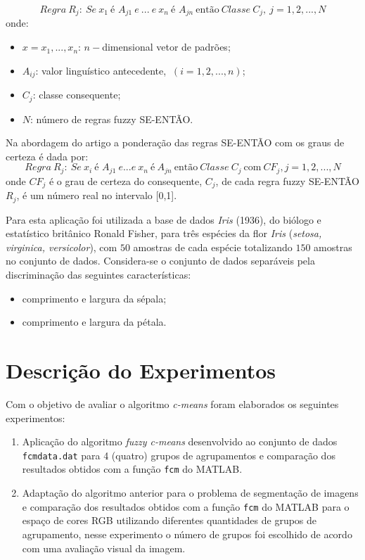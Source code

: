 \documentclass[12pt,a4paper]{article}
\numberwithin{equation}{section}
\begin{document}
{\begin{equation} \label{eq:eq1}
Regra~R_{j}:~Se~x_{1}~ \text{é }A_{j1}~e~...~e~x_{n}~\text{é }A_{jn}~\text{então}~Classe~C_{j},~j=1,2,...,N
\end{equation}
onde:
\begin{itemize}
\item $x={x_{1},...,x_{n}}$: $n-$dimensional vetor de padrões;
\item $A_{ij}$: valor linguístico antecedente, $~(i=1,2,...,n)$;
\item $C_{j}$: classe consequente;
\item $N$: número de regras fuzzy SE-ENTÃO.
\end{itemize}

Na abordagem do artigo a ponderação das regras SE-ENTÃO com os graus de certeza é dada por:
\begin{equation} \label{eq:eq2}
Regra~R_{j}:~Se~x_{i}~\text{é } A_{j1}~e...e~x_{n}~\text{é}~A_{jn}~\text{então}~Classe~C_{j}~\text{com}~CF_{j}, j=1,2,...,N
\end{equation}
onde $CF_{j}$ é o grau de certeza do consequente, $C_{j}$, de cada regra fuzzy SE-ENTÃO $R_{j}$, é um número real no intervalo [0,1].

Para esta aplicação foi utilizada a base de dados \textit{Iris} (1936), do biólogo e estatístico britânico Ronald Fisher, para três espécies da flor \textit{Iris} (\textit{setosa, virginica, versicolor}), com $50$ amostras de cada espécie totalizando $150$ amostras no conjunto de dados. Considera-se o conjunto de dados separáveis pela discriminação das seguintes características:

\begin{itemize}
\item comprimento e largura da sépala;
\item comprimento e largura da pétala.
\end{itemize}

\section{Descrição do Experimentos}
\label{section:descr}

Com o objetivo de avaliar o algoritmo \textit{c-means} foram elaborados os seguintes experimentos:

\begin{enumerate}
	\item Aplicação do algoritmo \textit{fuzzy c-means} desenvolvido ao conjunto de dados \texttt{fcmdata.dat} para 4 (quatro) grupos de agrupamentos e comparação dos resultados obtidos com a função \texttt{fcm} do MATLAB.
	\item Adaptação do algoritmo anterior para o problema de segmentação de imagens e comparação dos resultados obtidos com a função \texttt{fcm} do MATLAB para o espaço de cores RGB utilizando diferentes quantidades de grupos de agrupamento, nesse experimento o número de grupos foi escolhido de acordo com uma avaliação visual da imagem.
\end{enumerate}

}
\end{document}
